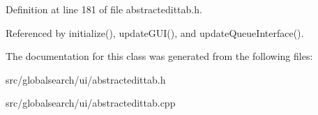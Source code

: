 Definition at line 181 of file abstractedittab.\-h.



Referenced by initialize(), update\-G\-U\-I(), and update\-Queue\-Interface().



The documentation for this class was generated from the following files\-:\begin{DoxyCompactItemize}
\item 
src/globalsearch/ui/abstractedittab.\-h\item 
src/globalsearch/ui/abstractedittab.\-cpp\end{DoxyCompactItemize}
